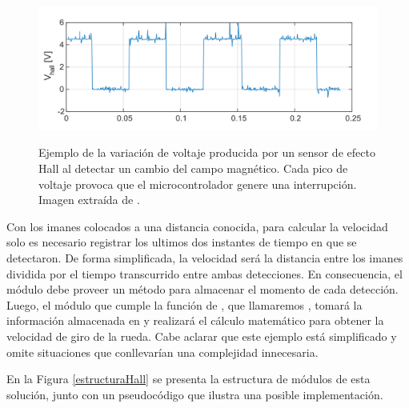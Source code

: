 \begin{figure}[H]
    
    \caption{Ejemplo de la variación de voltaje producida por un sensor de efecto Hall al detectar un cambio del campo magnético. Cada pico de voltaje provoca que el microcontrolador genere una interrupción. Imagen extraída de \cite{disenioViejo2}.}
    \centering
    \includegraphics[width=0.8\linewidth]{sensorHall.png}
    \label{hall}
\end{figure}


Con los imanes colocados a una distancia conocida, para calcular la velocidad solo es necesario registrar los ultimos dos instantes de tiempo en que se detectaron. De forma simplificada, la velocidad será la distancia entre los imanes dividida por el tiempo transcurrido entre ambas detecciones. En consecuencia, el módulo \Colector debe proveer un método para almacenar el momento de cada detección. Luego, el módulo que cumple la función de \Computador, que llamaremos \SensorVelocidad, tomará la información almacenada en \Colector y realizará el cálculo matemático para obtener la velocidad de giro de la rueda. Cabe aclarar que este ejemplo está simplificado y omite situaciones que conllevarían una complejidad innecesaria.

En la Figura \ref{estructuraHall} se presenta la estructura de módulos de esta solución, junto con un pseudocódigo que ilustra una posible implementación.

